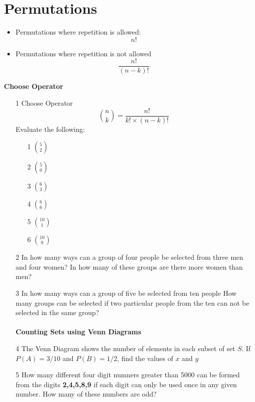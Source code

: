 \documentclass[12pt]{report}
\begin{document}
\newpage
		\section{Permutations}
		\Large
		\begin{itemize}
			\item Permutations where repetition is allowed: 
			\[ n! \]
			\item Permutations where repetition is not allowed
			\[ \frac{n!}{(n-k)!} \]
		\end{itemize}
\textbf{\;\;\;Choose Operator}
\begin{itemize}
	
	
	\item[1] Choose Operator
	\[ {n \choose k} = \frac{n!}{k! \times (n-k)!} \]
	Evaluate the following:
	\begin{multicols}{3}
		\begin{enumerate}
			\item[1] ${5 \choose 2}$
			\item[2] ${5 \choose 0}$
			\item[3] ${6 \choose 3}$
			\item[4] ${6 \choose 6}$
			\item[5] ${10 \choose 1}$
			\item[6] ${10 \choose 9}$
		\end{enumerate}        
	\end{multicols}
	\item[2] In how many ways can a group of four people be selected from three men and four women?
	In how many of these groups are there more women than men?
	\item[3] In how many ways can a group of five be selected from ten people
	How many groups can be selected if two particular people from the ten can not be selected in the same group?\\
	\\
	\textbf{Counting Sets using Venn Diagrams}
	\item[4] 
	The Venn Diagram shows the number of elements in each subset of set $S$.
	If $P(A) = 3/10$ and $P(B) = 1/2$, find the values of $x$ and $y$
	
	\item[5] How many different four digit numners greater than 5000 can be formed from the digits \textbf{2,4,5,8,9} if each digit can only be used once in any given number. How many of these numbers are odd?
\end{itemize}
\end{document}
